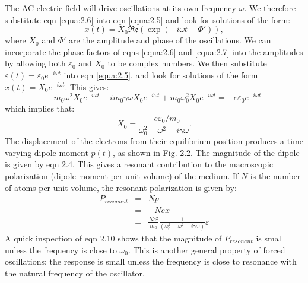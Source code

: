 \documentclass[12pt]{book}
\begin{document}
The AC electric field will drive oscillations at its own frequency $\omega$. We therefore substitute eqn \ref{equa:2.6} into eqn \ref{equa:2.5} and look for solutions of the form:
\begin{equation}\label{equa:2.7}
  x(t)=X_0\mathfrak{Re}(\exp(-i\omega t-\Phi')),
\end{equation}
where $X_0$ and $\Phi'$ are the amplitude and phase of the oscillations. We can incorporate the phase factors of eqns \ref{equa:2.6} and \ref{equa:2.7} into the amplitudes by allowing both $\varepsilon_0$ and $X_0$ to be complex numbers. We then substitute $\varepsilon(t)=\varepsilon_0e^{-i\omega t}$ into eqn \ref{equa:2.5}, and look for solutions of the form $x(t)=X_0e^{-i\omega t}$. This gives:
\begin{equation}\label{equa:2.8}
  -m_0\omega^2X_0e^{-i\omega t}-im_0\gamma\omega X_0e^{-i\omega t}+m_0\omega_0^2X_0e^{-i\omega t}=-e\varepsilon_0e^{-i\omega t}
\end{equation}
which implies that:
\begin{equation}\label{equa:2.9}
  X_0=\frac{-e\varepsilon_0/m_0}{\omega_0^2-\omega^2-i\gamma\omega}.
\end{equation}
The displacement of the electrons from their equilibrium position produces a time varying dipole moment $p(t)$, as shown in Fig. 2.2. The magnitude of the dipole is given by eqn 2.4. This gives a resonant contribution to the macroscopic polarization (dipole moment per unit volume) of the medium. If $N$ is the number of atoms per unit volume, the resonant polarization is given by:
\begin{eqnarray}\label{equa:2.10}
\nonumber  P_{resonant} &=& Np \\
\nonumber   &=& -Nex \\
   &=& \frac{Ne^2}{m_0}\frac{1}{(\omega_0^2-\omega^2-i\gamma\omega)}\varepsilon
\end{eqnarray}
A quick inspection of eqn 2.10 shows that the magnitude of $P_{resonant}$ is small unless the frequency is close to $\omega_0$. This is another general property of forced oscillations: the response is small unless the frequency is close to resonance with the natural frequency of the oscillator.
\end{document}
